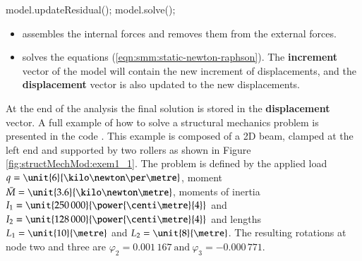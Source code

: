 \begin{cpp}
  model.updateResidual();
  model.solve();
\end{cpp}

\begin{itemize}
\item {} assembles the  internal forces and removes them
  from the external forces.
\item        {}         solves        the        equations
  (\ref{eqn:smm:static-newton-raphson}).   The \textbf{increment} vector  of the
  model   will   contain  the   new   increment   of   displacements,  and   the
  \textbf{displacement} vector is also updated to the new displacements.
\end{itemize}

At   the  end   of  the   analysis  the   final  solution   is  stored   in  the
\textbf{displacement}  vector.  A  full example  of  how to  solve a  structural
mechanics       problem        is       presented       in        the       code
.  This  example is composed  of a 2D
beam, clamped at  the left end and  supported by two rollers as  shown in Figure
\ref{fig:structMechMod:exem1_1}.  The problem  is  defined by  the applied  load
$q=\unit{6}{\kilo\newton\per\metre}$,          moment         $\bar{M}         =
\unit{3.6}{\kilo\newton\metre}$,      moments     of     inertia      $I_1     =
\unit{250\,000}{\power{\centi\metre}{4}}$           and          $I_2          =
\unit{128\,000}{\power{\centi\metre}{4}}$ and  lengths $L_1 = \unit{10}{\metre}$
and $L_2 = \unit{8}{\metre}$.  The resulting rotations at node two and three are
$ \varphi_2 = 0.001\,167\ \mbox{and}\ \varphi_3 = -0.000\,771.$


